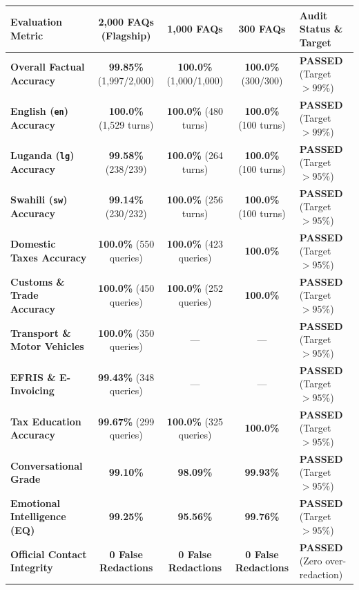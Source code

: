 \documentclass[10pt,a4paper]{article}
\begin{document}
\begin{table}[h!]
\centering
\small
\begin{tabularx}{\textwidth}{p{44mm} c c c X}
\toprule
\textbf{Evaluation Metric} & \textbf{2,000 FAQs (Flagship)} & \textbf{1,000 FAQs} & \textbf{300 FAQs} & \textbf{Audit Status \& Target} \\
\midrule
\textbf{Overall Factual Accuracy} & \textbf{99.85\%} (1,997/2,000) & \textbf{100.0\%} (1,000/1,000) & \textbf{100.0\%} (300/300) & \textbf{PASSED} (Target $>99\%$) \\
\textbf{English (\texttt{en}) Accuracy} & \textbf{100.0\%} (1,529 turns) & \textbf{100.0\%} (480 turns) & \textbf{100.0\%} (100 turns) & \textbf{PASSED} (Target $>99\%$) \\
\textbf{Luganda (\texttt{lg}) Accuracy} & \textbf{99.58\%} (238/239) & \textbf{100.0\%} (264 turns) & \textbf{100.0\%} (100 turns) & \textbf{PASSED} (Target $>95\%$) \\
\textbf{Swahili (\texttt{sw}) Accuracy} & \textbf{99.14\%} (230/232) & \textbf{100.0\%} (256 turns) & \textbf{100.0\%} (100 turns) & \textbf{PASSED} (Target $>95\%$) \\
\textbf{Domestic Taxes Accuracy} & \textbf{100.0\%} (550 queries) & \textbf{100.0\%} (423 queries) & \textbf{100.0\%} & \textbf{PASSED} (Target $>95\%$) \\
\textbf{Customs \& Trade Accuracy} & \textbf{100.0\%} (450 queries) & \textbf{100.0\%} (252 queries) & \textbf{100.0\%} & \textbf{PASSED} (Target $>95\%$) \\
\textbf{Transport \& Motor Vehicles} & \textbf{100.0\%} (350 queries) & --- & --- & \textbf{PASSED} (Target $>95\%$) \\
\textbf{EFRIS \& E-Invoicing} & \textbf{99.43\%} (348 queries) & --- & --- & \textbf{PASSED} (Target $>95\%$) \\
\textbf{Tax Education Accuracy} & \textbf{99.67\%} (299 queries) & \textbf{100.0\%} (325 queries) & \textbf{100.0\%} & \textbf{PASSED} (Target $>95\%$) \\
\textbf{Conversational Grade} & \textbf{99.10\%} & \textbf{98.09\%} & \textbf{99.93\%} & \textbf{PASSED} (Target $>95\%$) \\
\textbf{Emotional Intelligence (EQ)} & \textbf{99.25\%} & \textbf{95.56\%} & \textbf{99.76\%} & \textbf{PASSED} (Target $>95\%$) \\
\textbf{Official Contact Integrity} & \textbf{0 False Redactions} & \textbf{0 False Redactions} & \textbf{0 False Redactions} & \textbf{PASSED} (Zero over-redaction) \\

\end{tabularx}
\end{table}
\end{document}
